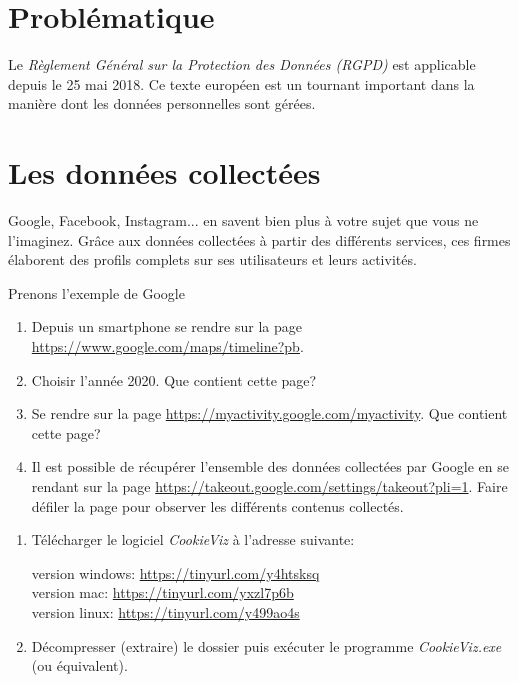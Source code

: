 \documentclass[a4paper,11pt]{article}
\begin{document}
\begin{Form}
\section{Problématique}
Le \emph{Règlement Général sur la Protection des Données (RGPD)} est applicable depuis le 25 mai 2018. Ce texte européen est un tournant important dans la manière dont les données personnelles sont gérées.
\begin{center}
\end{center}
\section{Les données collectées}
Google, Facebook, Instagram... en savent bien plus à votre sujet que vous ne l’imaginez. Grâce aux données collectées à partir des différents services, ces firmes élaborent des profils complets sur ses utilisateurs et leurs activités. 
\begin{activite}
Prenons l'exemple de Google
\begin{enumerate}
\item Depuis un smartphone se rendre sur la page \url{https://www.google.com/maps/timeline?pb}.
\item Choisir l'année 2020. Que contient cette page?
\item Se rendre sur la page \url{https://myactivity.google.com/myactivity}. Que contient cette page?
\item Il est possible de récupérer l'ensemble des données collectées par Google en se rendant sur la page \url{https://takeout.google.com/settings/takeout?pli=1}. Faire défiler la page pour observer les différents contenus collectés.
\end{enumerate}
\end{activite}
\begin{activite}
\begin{enumerate}
\item Télécharger le logiciel \emph{CookieViz} à l'adresse suivante:
\begin{center}
version windows: \url{https://tinyurl.com/y4htsksq}\\
version mac: \url{https://tinyurl.com/yxzl7p6b}\\
version linux: \url{https://tinyurl.com/y499ao4s}
\end{center}
\item Décompresser (extraire) le dossier puis exécuter le programme \emph{CookieViz.exe} (ou équivalent).

\end{enumerate}
\end{activite}
\end{Form}
\end{document}
